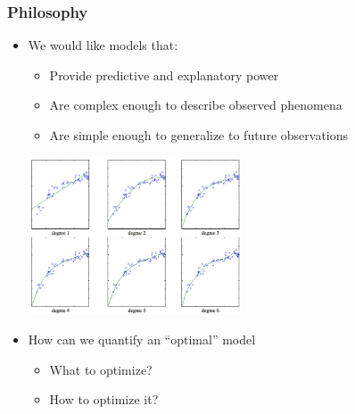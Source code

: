 \begin{frame}
  \frametitle{Philosophy}

    \begin{itemize}
      \item We would like models that:
        \begin{itemize}
          \item Provide predictive and explanatory power
          \item Are complex enough to describe observed phenomena
          \item Are simple enough to generalize to future observations
        \end{itemize}

    \begin{center}
      \includegraphics[width=0.5\textwidth]{regression.png}
    \end{center}


      \pause
      \item How can we quantify an ``optimal'' model
        \begin{itemize}
          \item What to optimize?
          \item How to optimize it?
        \end{itemize}

    \end{itemize}

\end{frame}



